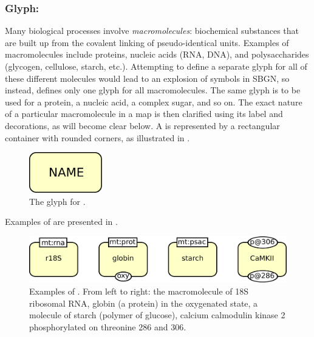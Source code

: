 \subsubsection{Glyph: }
\label{sec:macromolecule}

Many biological processes involve \emph{macromolecules}: biochemical substances that are built up from the covalent linking of pseudo-identical units.  Examples of macromolecules include proteins, nucleic acids (RNA, DNA), and polysaccharides (glycogen, cellulose, starch, etc.).  Attempting to define a separate glyph for all of these different molecules would lead to an explosion of symbols in SBGN, so instead, \SBGNPDLone defines only one glyph for all macromolecules.  The same glyph is to be used for a protein, a nucleic acid, a complex sugar, and so on.  The exact nature of a particular macromolecule in a map is then clarified using its label and decorations, as will become clear below.  A  is represented by a rectangular container with rounded corners, as illustrated in . 

\begin{figure}[htb]
  \centering
  \includegraphics[width = 1.25in]{le_images/macromolecule-plain}
  \caption{The \PD glyph for .}
  \label{fig:macromolecule}
\end{figure}

Examples of  are presented in .

\begin{figure}[htb]
  \centering
  \includegraphics[scale = 0.5]{le_images/macromolecule-examples}
  \caption{Examples of . From left to right: the macromolecule of 18S ribosomal RNA, globin (a protein) in the oxygenated state, a molecule of starch (polymer of glucose), calcium calmodulin kinase 2 phosphorylated on threonine 286 and 306.}
  \label{fig:macromolecule-examples}
\end{figure}


